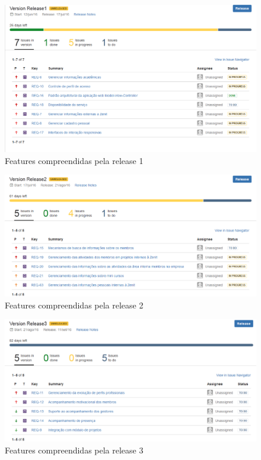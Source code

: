 \begin{anexosenv}
\begin{figure}
    \centering
    \includegraphics[keepaspectratio=true,scale=0.5]{figuras/roadmapft1.eps}
    \caption[Release 1 de features]{Features compreendidas pela release 1}
\end{figure}
\begin{figure}
    \centering
    \includegraphics[keepaspectratio=true,scale=0.5]{figuras/roadmapft2.eps}
    \caption[Release 2 de features]{Features compreendidas pela release 2}
\end{figure}
\begin{figure}
    \centering
    \includegraphics[keepaspectratio=true,scale=0.5]{figuras/roadmapft3.eps}
    \caption[Release 3 de features]{Features compreendidas pela release 3}
\end{figure}


\end{anexosenv}
